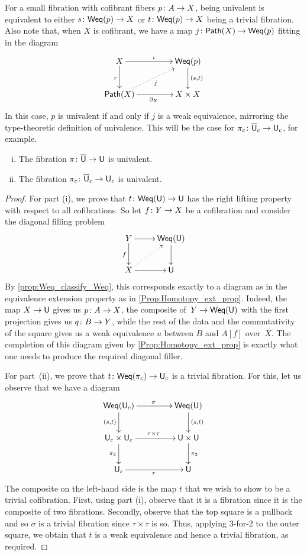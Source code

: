 \documentclass[reqno,10pt,a4paper,oneside,draft]{amsart}
\begin{document}
\smallskip

For a small fibration with cofibrant fibers $p \colon A \to X$, being univalent is equivalent to
either $s \colon \mathsf{Weq}(p) \to X$ or $t \colon \mathsf{Weq}(p) \to X$ being a trivial fibration.  Also note that, when $X$
is cofibrant, we have a map $j \colon \mathsf{Path}(X) \to \mathsf{Weq}(p)$ fitting in the diagram
\[
\xymatrix@C=1.5cm{
X \ar[r]^i \ar[d]_r & \Weq(p) \ar[d]^{(s,t)} \\
\Path(X) \ar[r]_{\partial_X}  \ar@{.>}[ur]_{j} &  X \times X }
\]
In this case, $p$ is univalent if and only if $j$ is a weak equivalence, mirroring the type-theoretic
definition of univalence. This will be the case for $\pi_c \colon \overline{\mathsf{U}}_c \to \mathsf{U}_c$, for example.





\begin{theorem}  \label{thm:univalence-of-u-and-uc} \hfill 
\begin{enumerate}[(i)]
\item The fibration $\pi \colon \overline{\mathsf{U}} \to \mathsf{U}$ is univalent.
\item The fibration $\pi_c \colon \overline{\mathsf{U}}_c \to \mathsf{U}_c$ is univalent.
\end{enumerate}
\end{theorem}

\begin{proof} For part (i), we prove that $t \colon  \mathsf{Weq}(\mathsf{U}) \to \mathsf{U}$ has the right lifting property with respect
to all cofibrations. So let $f \colon Y \rightarrow X$ be a cofibration and consider the diagonal
filling problem
\[
\xymatrix{Y \ar[d]_f \ar[r] & \mathsf{Weq}(\U) \ar[d] \\
X \ar[r] \ar@{.>}[ur]  & \U 
}
\]
By  \cref{prop:Weq_classify_Weq}, this corresponds exactly to a diagram as in the equivalence extension property as in \cref{Prop:Homotopy_ext_prop}. Indeed, the map $X \rightarrow \mathsf{U}$ gives us
$p \colon A \to X$, the composite of~$Y \rightarrow  \mathsf{Weq}(\mathsf{U})$ with the first projection
gives us $q \colon B \to Y$, while the rest of the data and the commutativity of the square 
gives us a weak equivalence $u$ between $B$ and $A[f]$ over~$X$. The completion of this diagram given by \cref{Prop:Homotopy_ext_prop} is exactly what one needs to produce the required diagonal filler.

For part~(ii), we prove that $t \colon \mathsf{Weq}(\pi_c) \to \mathsf{U}_c$ is a trivial fibration. For this, let us
observe that we have a diagram 
\[
\xymatrix@C=1.5cm{
\Weq(\U_c) \ar[r]^{\sigma}  \ar[d]_{(s,t)} & \Weq(\U) \ar[d]^{(s,t)} \\
\U_c \times \U_c \ar[r]^{\tau \times \tau} \ar[d]_{\pi_2} & \U \times \U \ar[d]^{\pi_2} \\
\U_c \ar[r]_\tau & \U }
\]
The composite  on the left-hand side is the map $t$ that we wish to show to be a trivial cofibration.
First, using part (i), observe that it is a fibration since it is the composite of two fibrations. Secondly,
observe that the top square is a pullback and so $\sigma$ is a trivial fibration since $\tau \times \tau$ 
is so. Thus, applying 3-for-2 to the outer square, we obtain that $t$ is a weak equivalence and hence
a trivial fibration, as required.
\end{proof} 
\end{document}
